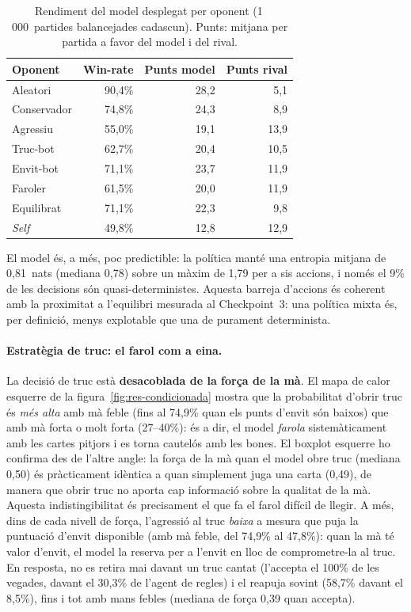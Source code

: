 \begin{table}[H]
  \centering
  \begin{tabular}{lrrr}
    \toprule
    Oponent & Win-rate & Punts model & Punts rival \\
    \midrule
    Aleatori     & 90{,}4\% & 28{,}2 &  5{,}1 \\
    Conservador  & 74{,}8\% & 24{,}3 &  8{,}9 \\
    Agressiu     & 55{,}0\% & 19{,}1 & 13{,}9 \\
    Truc-bot     & 62{,}7\% & 20{,}4 & 10{,}5 \\
    Envit-bot    & 71{,}1\% & 23{,}7 & 11{,}9 \\
    Faroler      & 61{,}5\% & 20{,}0 & 11{,}9 \\
    Equilibrat   & 71{,}1\% & 22{,}3 &  9{,}8 \\
    \emph{Self}  & 49{,}8\% & 12{,}8 & 12{,}9 \\
    \bottomrule
  \end{tabular}
  \caption{Rendiment del model desplegat per oponent (1\,000~partides balancejades
           cadascun). Punts: mitjana per partida a favor del model i del rival.}%
  \label{tab:res-rendiment}
\end{table}

El model és, a més, poc predictible: la política manté una entropia mitjana de 0{,}81~nats
(mediana 0{,}78) sobre un màxim de 1{,}79 per a sis accions, i només el 9\% de les decisions
són quasi-deterministes. Aquesta barreja d'accions és coherent amb la proximitat a
l'equilibri mesurada al Checkpoint~3: una política mixta és, per definició, menys explotable
que una de purament determinista.

\paragraph{Estratègia de truc: el farol com a eina.} La decisió de truc està
\textbf{desacoblada de la força de la mà}. El mapa de calor esquerre de la
figura~\ref{fig:res-condicionada} mostra que la probabilitat d'obrir truc és \emph{més alta}
amb mà feble (fins al 74{,}9\% quan els punts d'envit són baixos) que amb mà forta o molt
forta (27--40\%): és a dir, el model \emph{farola} sistemàticament amb les cartes pitjors i
es torna cautelós amb les bones. El boxplot esquerre ho confirma des de l'altre angle: la
força de la mà quan el model obre truc (mediana 0{,}50) és pràcticament idèntica a quan
simplement juga una carta (0{,}49), de manera que obrir truc no aporta cap informació sobre
la qualitat de la mà. Aquesta indistingibilitat és precisament el que fa el farol difícil de
llegir. A més, dins de cada nivell de força, l'agressió al truc \emph{baixa} a mesura que
puja la puntuació d'envit disponible (amb mà feble, del 74{,}9\% al 47{,}8\%): quan la mà té
valor d'envit, el model la reserva per a l'envit en lloc de comprometre-la al truc. En
resposta, no es retira mai davant un truc cantat (l'accepta el 100\% de les vegades, davant
el 30{,}3\% de l'agent de regles) i el reapuja sovint (58{,}7\% davant el 8{,}5\%), fins i
tot amb mans febles (mediana de força 0{,}39 quan accepta).

